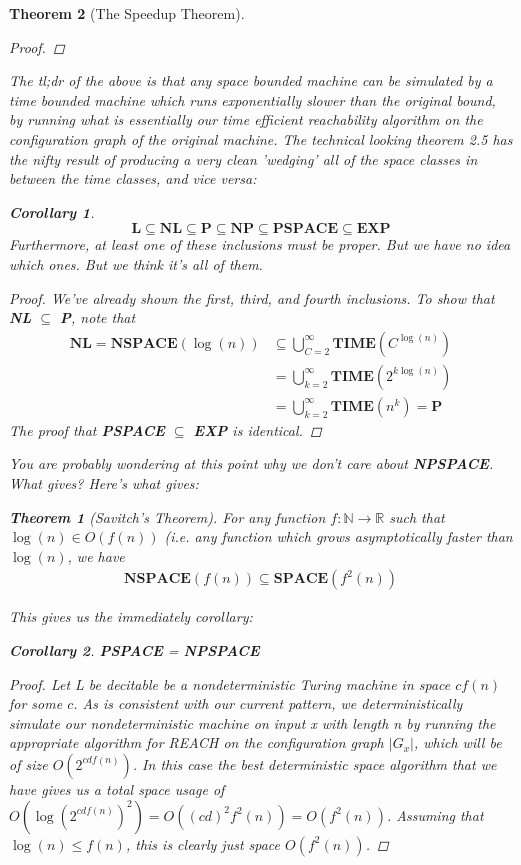 \documentclass{article}
\theoremstyle{definition}
\theoremstyle{plain}
\theoremstyle{theorem}
\newtheorem{theorem}{Theorem}[section]
\newtheorem{corollary}{Corollary}[section]
\begin{document}
\begin{theorem}[The Speedup Theorem]
\begin{proof}
\end{proof}
The tl;dr of the above is that any space bounded machine can be simulated by a time bounded machine which runs exponentially slower than the original bound, by running what is essentially our time efficient reachability algorithm on the configuration graph of the original machine. The technical looking theorem 2.5 has the nifty result of producing a very clean 'wedging' all of the space classes in between the time classes, and vice versa:
\begin{corollary}
    \[ \textbf{L} \subseteq \textbf{NL} \subseteq \textbf{P} \subseteq \textbf{NP} \subseteq \textbf{PSPACE} \subseteq \textbf{EXP} \]
    Furthermore, at least one of these inclusions must be proper. But we have no idea which ones. But we think it's all of them.
\end{corollary}
\begin{proof}
We've already shown the first, third, and fourth inclusions. To show that \textbf{NL} $\subseteq$ \textbf{P}, note that
\begin{align}
	\textbf{NL} = \textbf{NSPACE}(\log(n)) &\subseteq \bigcup_{C=2}^{\infty}\textbf{TIME}(C^{\log(n)}) \\
	&= \bigcup_{k=2}^{\infty}\textbf{TIME}(2^{k\log(n)}) \\
	&= \bigcup_{k=2}^{\infty}\textbf{TIME}(n^k) = \textbf{P}
\end{align}  
The proof that \textbf{PSPACE} $\subseteq$ \textbf{EXP} is identical.  
\end{proof}
You are probably wondering at this point why we don't care about \textbf{NPSPACE}. What gives? Here's what gives:
\begin{theorem}[Savitch's Theorem] For any function $f:\mathbb{N} \to \mathbb{R}$ such that $\log(n) \in O(f(n))$ (i.e. any function which grows asymptotically faster than $\log(n)$, we have
\begin{align}
    \textbf{NSPACE$(f(n))$} \subseteq \textbf{SPACE$(f^2(n))$}
\end{align}
\end{theorem}
This gives us the immediately corollary:
\begin{corollary}
\textbf{PSPACE} = \textbf{NPSPACE} 
\end{corollary}
\begin{proof}
Let L be decitable be a nondeterministic Turing machine in space $cf(n)$ for some $c$. As is consistent with our current pattern, we deterministically simulate our nondeterministic machine on input x with length n by running the appropriate algorithm for REACH on the configuration graph $|G_x|$, which will be of size $O(2^{cdf(n)})$. In this case the best deterministic space algorithm that we have gives us a total space usage of $O(\log(2^{cdf(n)})^2)=O((cd)^2f^2(n)) = O(f^2(n))$. Assuming that $\log(n) \leq f(n)$, this is clearly just space $O(f^2(n))$. 

\end{proof}
\end{theorem}
\end{document}

